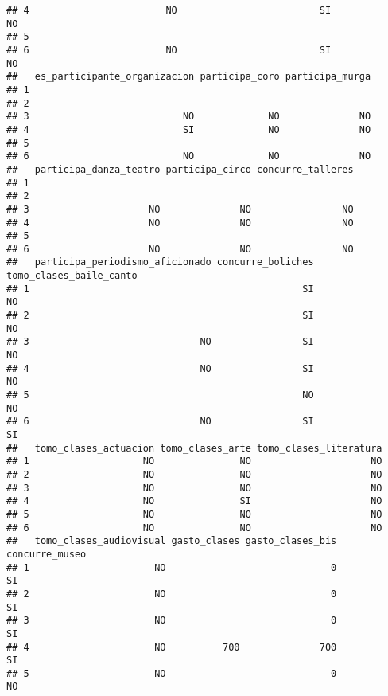 \documentclass[
]{article}
\begin{document}
\begin{verbatim}
## 4                        NO                         SI                       NO
## 5                                                                              
## 6                        NO                         SI                       NO
##   es_participante_organizacion participa_coro participa_murga
## 1                                                            
## 2                                                            
## 3                           NO             NO              NO
## 4                           SI             NO              NO
## 5                                                            
## 6                           NO             NO              NO
##   participa_danza_teatro participa_circo concurre_talleres
## 1                                                         
## 2                                                         
## 3                     NO              NO                NO
## 4                     NO              NO                NO
## 5                                                         
## 6                     NO              NO                NO
##   participa_periodismo_aficionado concurre_boliches tomo_clases_baile_canto
## 1                                                SI                      NO
## 2                                                SI                      NO
## 3                              NO                SI                      NO
## 4                              NO                SI                      NO
## 5                                                NO                      NO
## 6                              NO                SI                      SI
##   tomo_clases_actuacion tomo_clases_arte tomo_clases_literatura
## 1                    NO               NO                     NO
## 2                    NO               NO                     NO
## 3                    NO               NO                     NO
## 4                    NO               SI                     NO
## 5                    NO               NO                     NO
## 6                    NO               NO                     NO
##   tomo_clases_audiovisual gasto_clases gasto_clases_bis concurre_museo
## 1                      NO                             0             SI
## 2                      NO                             0             SI
## 3                      NO                             0             SI
## 4                      NO          700              700             SI
## 5                      NO                             0             NO

\end{verbatim}
\end{document}
